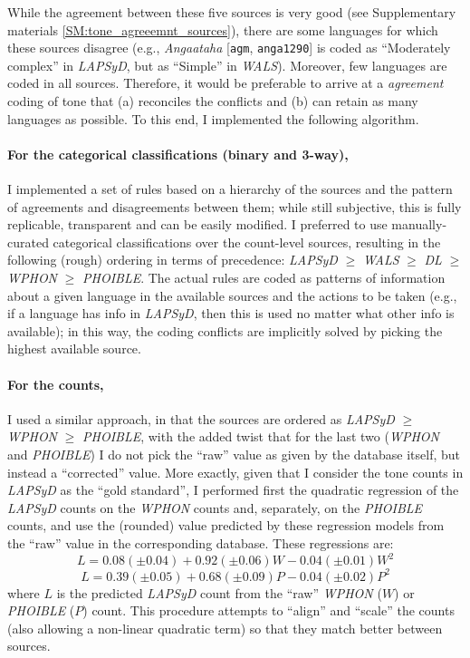 \documentclass[twoside,twocolumn]{article}
\begin{document}
While the agreement between these five sources is very good (see Supplementary materials \ref{SM:tone_agreeemnt_sources}), there are some languages for which these sources disagree (e.g., \textit{Angaataha} [\texttt{agm}, \texttt{anga1290}] is coded as ``Moderately complex'' in \textit{LAPSyD}, but as ``Simple'' in \textit{WALS}).
Moreover, few languages are coded in all sources.
Therefore, it would be preferable to arrive at a \emph{agreement} coding of tone that (a) reconciles the conflicts and (b) can retain as many languages as possible.
To this end, I implemented the following algorithm.

\paragraph{For the categorical classifications (binary and 3-way),}
I implemented a set of rules based on a hierarchy of the sources and the pattern of agreements and disagreements between them; while still subjective, this is fully replicable, transparent and can be easily modified.
I preferred to use manually-curated categorical classifications over the count-level sources, resulting in the following (rough) ordering in terms of precedence: \textit{LAPSyD} $\geq$ \textit{WALS} $\geq$ \textit{DL} $\geq$ \textit{WPHON} $\geq$ \textit{PHOIBLE}.
The actual rules are coded as patterns of information about a given language in the available sources and the actions to be taken (e.g., if a language has info in \textit{LAPSyD}, then this is used no matter what other info is available); in this way, the coding conflicts are implicitly solved by picking the highest available source.

\paragraph{For the counts,}
I used a similar approach, in that the sources are ordered as \textit{LAPSyD} $\geq$ \textit{WPHON} $\geq$ \textit{PHOIBLE}, with the added twist that for the last two (\textit{WPHON} and \textit{PHOIBLE}) I do not pick the ``raw'' value as given by the database itself, but instead a ``corrected'' value.
More exactly, given that I consider the tone counts in \textit{LAPSyD} as the ``gold standard'', I performed first the quadratic regression of the \textit{LAPSyD} counts on the \textit{WPHON} counts and, separately, on the  \textit{PHOIBLE} counts, and use the (rounded) value predicted by these regression models from the ``raw'' value in the corresponding database.
These regressions are:
$$L = 0.08 (\pm0.04) + 0.92 (\pm0.06)W - 0.04 (\pm0.01)W^2$$
$$L = 0.39 (\pm0.05) + 0.68 (\pm0.09)P - 0.04 (\pm0.02)P^2$$
where $L$ is the predicted \textit{LAPSyD} count from the ``raw'' \textit{WPHON} ($W$) or \textit{PHOIBLE} ($P$) count.
This procedure attempts to ``align'' and ``scale'' the counts (also allowing a non-linear quadratic term) so that they match better between sources.
\end{document}
